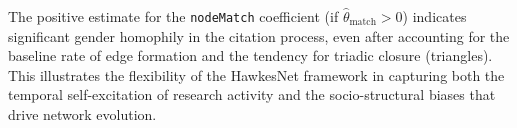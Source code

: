 \documentclass[12pt]{article}
\begin{document}
The positive estimate for the \texttt{nodeMatch} coefficient (if $\hat{\theta}_{\text{match}} > 0$) indicates significant gender homophily in the citation process, even after accounting for the baseline rate of edge formation and the tendency for triadic closure (triangles). This illustrates the flexibility of the HawkesNet framework in capturing both the temporal self-excitation of research activity and the socio-structural biases that drive network evolution.




\clearpage


\end{document}
